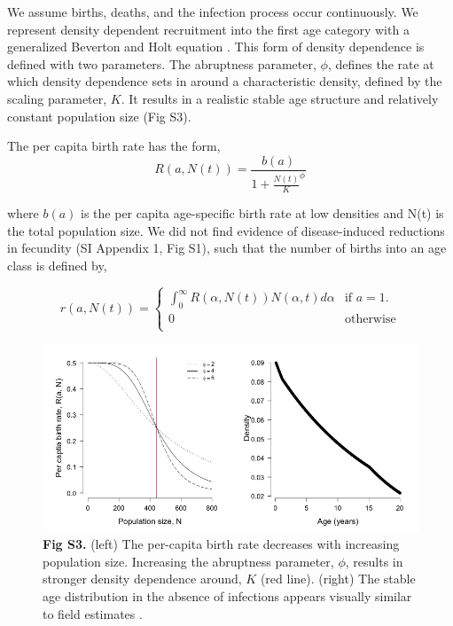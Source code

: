 \documentclass[10pt,letterpaper]{article}
\begin{document}
We assume births, deaths, and the infection process occur continuously. 
We represent density dependent recruitment into the first age category \cite{sinclair_resource_1975} with a generalized Beverton and Holt equation \cite{getz_hypothesis_1996}. 
This form of density dependence is defined with two parameters.  
The abruptness parameter, $\phi$, defines the rate at which density dependence sets in around a characteristic density, defined by the scaling parameter, $K$. 
It results in a realistic stable age structure and relatively constant population size (Fig S3). 

The per capita birth rate has the form, \\
\begin{equation}
R(a, N(t)) = \frac{b(a)}{1 + \frac{N(t)}{K}^\phi}
\end{equation}

where $b(a)$ is the per capita age-specific birth rate at low densities and N(t) is the total population size. We did not find evidence of disease-induced reductions in fecundity (SI Appendix 1, Fig S1), such that the number of births into an age class is defined by,

\begin{equation}
r(a, N(t)) = 
\begin{cases}
\int_{0}^{\infty}  R(\alpha, N(t))N(\alpha, t) d\alpha & \text{if $a = 1.$} \\
0 & \text{otherwise} \\
\end{cases}
\end{equation}


\begin{figure}
  \centering
  \includegraphics[width = \textwidth]{FigureS3_BH_and_agestructure.png}
  \caption*{\textbf{Fig S3.} (left) The per-capita birth rate decreases with increasing population size.  Increasing the abruptness parameter, $\phi$, results in stronger density dependence around, $K$ (red line). (right) The stable age distribution in the absence of infections appears visually similar to field estimates \cite{jolles_population_2007, Caron_ecological_2003}. }
\label{fig:figS3}
\end{figure}
\end{document}
